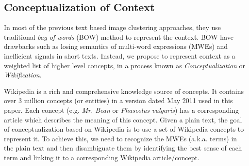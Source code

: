 \subsection{Conceptualization of Context}

In most of the previous text based image clustering approaches, they use traditional
\emph{bag of words} (BOW) method to represent the context. BOW have drawbacks such as
losing semantics of multi-word expressions (MWEs) and inefficient signals in short texts.
Instead, we propose to represent context as a weighted list of higher level concepts,
in a process known as \emph{Conceptualization} or \emph{Wikification}.


Wikipedia is a rich and comprehensive knowledge source of concepts.
It contains over 3 million concepts (or entities) in a version dated May 2011 used
in this paper.
Each concept (e.g. {\em Mr. Bean} or {\em Phaseolus vulgaris}) has a corresponding article
which describes the meaning of this concept.
Given a plain text, the goal of conceptualization based on Wikipedia is to use a set of
Wikipedia concepts to represent it. To achieve this, we need to recognize the MWEs
(a.k.a. terms) in the plain text and then disambiguate them
by identifying the best sense of each
term and linking it to a corresponding Wikipedia article/concept.
%

